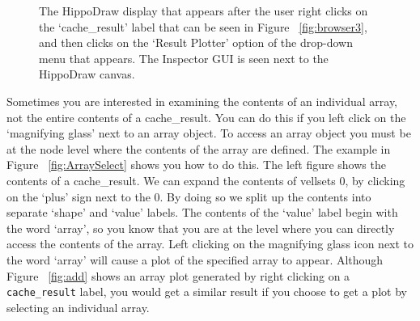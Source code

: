 \documentclass[10pt]{article}
\begin{document}
\begin{figure}
{\par\centering
{}
\par}
\caption {The HippoDraw display that appears after the user
right clicks on the `cache\_result' label that can be seen in
Figure ~\ref{fig:browser3}, and then clicks on the `Result Plotter' option
of the drop-down menu that appears. The Inspector GUI is seen next to
the HippoDraw canvas.}
\label{fig:browser4}
\end{figure}

Sometimes you are interested in examining the contents of an individual
array, not the entire contents of a cache\_result. You can
do this if you left click on the `magnifying glass' next to an
array object. To access an array object you must be at the
node level where the contents of the array are defined. The example in
Figure ~\ref{fig:ArraySelect} shows you how to do this. The left
figure shows the contents of a cache\_result. We can expand the
contents of vellsets 0, by clicking on the `plus' sign next to the
0. By doing so we split up the contents into separate `shape' and `value'
labels. The contents of the `value' label begin with the word `array',
so you know that you are at the level where you can directly access
the contents of the array. Left clicking on the magnifying glass icon
next to the word `array' will cause a plot of the specified array
to appear. Although Figure ~\ref{fig:add} shows an array plot generated
by right clicking on a {\tt cache\_result} label, you would get a similar
result if you choose to get a plot by selecting an individual array.
\end{document}
